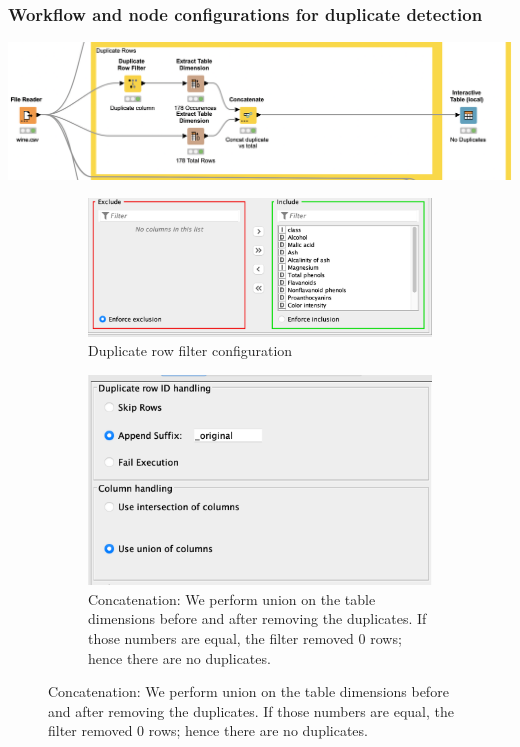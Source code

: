 \documentclass[11pt]{article}
\begin{document}
			\subsubsection*{Workflow and node configurations for duplicate detection}
			\iftrue
			\begin{center}
				\includegraphics[scale=0.5]{res/t0/t02/t02-workflow}
			\end{center}
			\fi
			\iftrue
			\begin{figure}[H]
				\centering
				\begin{subfigure}{0.4\textwidth}
					\includegraphics[width=\textwidth]{res/t0/t02/t02-duplicate-filter-conf}
					\caption{Duplicate row filter configuration}
					\label{fig:first}
				\end{subfigure}
				\hfill
				\begin{subfigure}{0.4\textwidth}
					\includegraphics[width=\textwidth]{res/t0/t02/t02-concat-conf}
					\caption{Concatenation: We perform union on the table dimensions before and after removing the duplicates. If those numbers are equal, the filter removed 0 rows; hence there are no duplicates.}
					\label{fig:second}
				\end{subfigure}
				\hfill
			\end{figure}
			\fi
\end{document}
